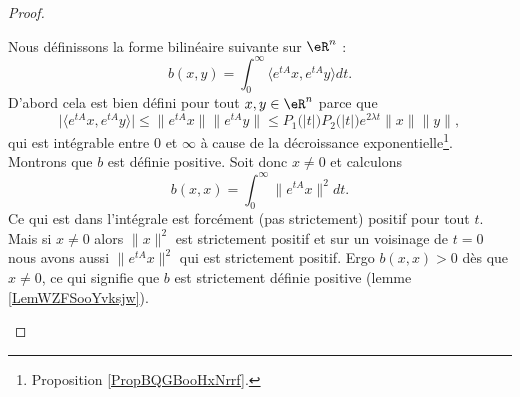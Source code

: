 \begin{proof}
\begin{subproof}
    Nous définissons la forme bilinéaire suivante sur \( \eR^n\) :
    \begin{equation}
        b(x,y)=\int_0^{\infty}\langle  e^{tA}x,  e^{tA}y\rangle dt.
    \end{equation}
    D'abord cela est bien défini pour tout \( x,y\in \eR^n\) parce que
    \begin{equation}
        \big| \langle  e^{tA}x,  e^{tA}y\rangle  \big|\leq \|  e^{tA}x \|\|  e^{tA}y \|\leq P_1\big( | t | \big)P_2\big( | t | \big) e^{2\lambda t}\| x \|\| y \|,
    \end{equation}
    qui est intégrable entre \( 0\) et \( \infty\) à cause de la décroissance exponentielle\footnote{Proposition \ref{PropBQGBooHxNrrf}.}. Montrons que \( b\) est définie positive. Soit donc \( x\neq 0\) et calculons
    \begin{equation}
        b(x,x)=\int_0^{\infty}\|  e^{tA}x \|^2dt.
    \end{equation}
    Ce qui est dans l'intégrale est forcément (pas strictement) positif pour tout \( t\). Mais si \( x\neq 0\) alors \( \| x \|^2\) est strictement positif et sur un voisinage de \( t=0\) nous avons aussi \( \|  e^{tA}x \|^2\) qui est strictement positif. Ergo \( b(x,x)>0\) dès que \( x\neq 0\), ce qui signifie que \( b\) est strictement définie positive (lemme \ref{LemWZFSooYvksjw}).


\end{subproof}
\end{proof}
